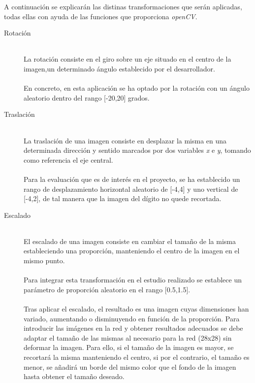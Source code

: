 A continuación se explicarán las distinas transformaciones que serán aplicadas, todas ellas con ayuda de las funciones que proporciona \textit{openCV}.
\vspace{10pt}
\begin{description}
	\item[Rotación] \hfill 
	\vspace{5pt}
	\\
	La rotación consiste en el giro sobre un eje situado en el centro de la imagen,un determinado ángulo establecido por el desarrollador.\\
	\vspace{-10pt}
	\\
	En concreto, en esta aplicación se ha optado por la rotación con un ángulo aleatorio dentro del rango [-20,20] grados.
	\vspace{10pt}
	\item[Traslación] \hfill 
	\vspace{5pt}
	\\
	La traslación de una imagen consiste en desplazar la misma en una determinada dirección y sentido marcados por dos variables \textit{x} e \textit{y}, tomando como referencia el eje central.\\
	\vspace{-10pt}
	\\
	Para la evaluación que es de interés en el proyecto, se ha establecido un rango de desplazamiento horizontal aleatorio de [-4,4] y uno vertical de [-4,2], de tal manera que la imagen del dígito no quede recortada.
	\vspace{10pt}
	\item[Escalado] \hfill 
	\vspace{5pt}
	\\
	El escalado de una imagen consiste en cambiar el tamaño de la misma estableciendo una proporción, manteniendo el centro de la imagen en el mismo punto.\\
	\vspace{-10pt}
	\\
	Para integrar esta transformación en el estudio realizado se establece un parámetro de proporción aleatorio en el rango [0.5,1.5].\\
	\vspace{-10pt}
	\\
	Tras aplicar el escalado, el resultado es una imagen cuyas dimensiones han variado, aumentando o disminuyendo en función de la proporción. Para introducir las imágenes en la red y obtener resultados adecuados se debe adaptar el tamaño de las mismas al necesario para la red (28x28) sin deformar la imagen. Para ello, si el tamaño de la imagen es mayor, se recortará la misma manteniendo el centro, si por el contrario, el tamaño es menor, se añadirá un borde del mismo color que el fondo de la imagen hasta obtener el tamaño deseado.

\end{description}
